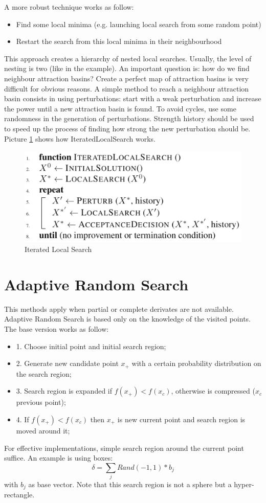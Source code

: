 \documentclass[10pt]{article}
\begin{document}
A more robust technique works as follow:
\begin{itemize}
\item{Find some local minima (e.g. launching local search from some random point)}
\item{Restart the search from this local minima in their neighbourhood}
\end{itemize}
This approach creates a hierarchy of nested local searches. Usually, the level of nesting is two (like in the example). An important question is: how do we find neighbour attraction basins? Create a perfect map of attraction basins is very difficult for obvious reasons. A simple method to reach a neighbour attraction basin consists in using perturbations: start with a weak perturbation and increase the power until a new attraction basin is found. To avoid cycles, use some randomness in the generation of perturbations. Strength history should be used to speed up the process of finding how strong the new perturbation should be.
Picture \ref{fig:ils} shows how IteratedLocalSearch works.

\begin{figure}[H]
\includegraphics[scale=0.25]{ils}
\caption{Iterated Local Search}
\centering
\label{fig:ils}
\end{figure}

\section{Adaptive Random Search}
This methods apply when partial or complete derivates are not available. Adaptive Random Search is based only on the knowledge of the visited points. The base version works as follow:
\begin{itemize}
\item{1. Choose initial point and initial search region;}
\item{2. Generate new candidate point $x_+$ with a certain probability distribution on the search region;}
\item{3. Search region is expanded if $f(x_+) < f(x_c)$, otherwise is compressed ($x_c$ previous point);}
\item{4. If $f(x_+) < f(x_c)$ then $x_+$ is new current point and search region is moved around it;}
\end{itemize}
For effective implementations, simple search region around the current point suffice. An example is using boxes: 
$$
\delta = \sum_{j} Rand(-1,1) * b_j
$$
 with $b_j$ as base vector. Note that this search region is not a sphere but a hyper-rectangle.
\end{document}
